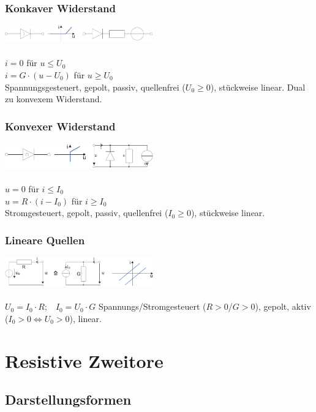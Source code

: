\documentclass[a4paper,twocolumn,10pt]{article}
\begin{document}
\subsubsection*{Konkaver Widerstand}
\includegraphics[width=0.48\textwidth]{Grafiken/Rkonkav}\\\\
$i=0$ für $u\leq U_0$\\
$i=G\cdot (u-U_0)$ für $u\geq U_0$\\
Spannungsgesteuert, gepolt, passiv, quellenfrei ($U_0\ge 0$), stückweise linear. Dual zu konvexem Widerstand.

\subsubsection*{Konvexer Widerstand}
\includegraphics[width=0.48\textwidth]{Grafiken/Rkonvex}\\\\
$u=0$ für $i\leq I_0$\\
$u=R\cdot (i-I_0)$ für $i\geq I_0$\\
Stromgesteuert, gepolt, passiv, quellenfrei ($I_0\geq 0$), stückweise linear.

\subsubsection*{Lineare Quellen}
\includegraphics[width=0.48\textwidth]{Grafiken/lineareQuellen}\\\\
$U_0=I_0\cdot R;\;\;\;I_0=U_0\cdot G$
Spannungs/Stromgesteuert ($R>0$/$G>0$), gepolt, aktiv ($I_0>0 \Leftrightarrow U_0>0$), linear.

\section*{Resistive Zweitore}
\subsection*{Darstellungsformen}
\end{document}
